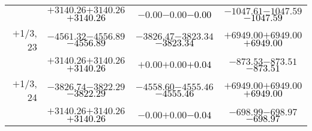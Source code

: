 \documentclass[compress]{beamer}
\begin{document}
\begin{frame}
{\begin{tabular}{r | c | c | c}
           & $+3140.26$\hspace{0.1 cm}$+3140.26$\hspace{0.1 cm}\textcolor{black}{$+3140.26$} & $-0.00$\hspace{0.1 cm}$-0.00$\hspace{0.1 cm}\textcolor{black}{$-0.00$} & $-1047.61$\hspace{0.1 cm}$-1047.59$\hspace{0.1 cm}\textcolor{black}{$-1047.59$} \\
$+$1/3, 23 & $-4561.32$\hspace{0.1 cm}$-4556.89$\hspace{0.1 cm}\textcolor{black}{$-4556.89$} & $-3826.47$\hspace{0.1 cm}$-3823.34$\hspace{0.1 cm}\textcolor{black}{$-3823.34$} & $+6949.00$\hspace{0.1 cm}$+6949.00$\hspace{0.1 cm}\textcolor{black}{$+6949.00$} \\
           & $+3140.26$\hspace{0.1 cm}$+3140.26$\hspace{0.1 cm}\textcolor{black}{$+3140.26$} & $+0.00$\hspace{0.1 cm}$+0.00$\hspace{0.1 cm}\textcolor{black}{$+0.04$} & $-873.53$\hspace{0.1 cm}$-873.51$\hspace{0.1 cm}\textcolor{black}{$-873.51$} \\
$+$1/3, 24 & $-3826.74$\hspace{0.1 cm}$-3822.29$\hspace{0.1 cm}\textcolor{black}{$-3822.29$} & $-4558.60$\hspace{0.1 cm}$-4555.46$\hspace{0.1 cm}\textcolor{black}{$-4555.46$} & $+6949.00$\hspace{0.1 cm}$+6949.00$\hspace{0.1 cm}\textcolor{black}{$+6949.00$} \\
           & $+3140.26$\hspace{0.1 cm}$+3140.26$\hspace{0.1 cm}\textcolor{black}{$+3140.26$} & $-0.00$\hspace{0.1 cm}$+0.00$\hspace{0.1 cm}\textcolor{black}{$-0.04$} & $-698.99$\hspace{0.1 cm}$-698.97$\hspace{0.1 cm}\textcolor{black}{$-698.97$} \\
\end{tabular}}
\end{frame}
\end{document}

